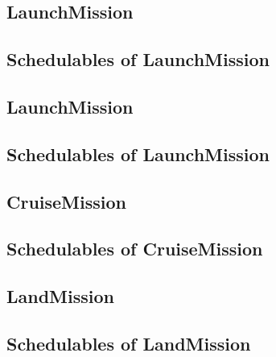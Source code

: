 \documentclass[10pt,a4paper]{article}
\begin{document}
\subsection{LaunchMission}

\newpage

\subsection{Schedulables of LaunchMission}


\newpage


\subsection{LaunchMission}

\newpage

\subsection{Schedulables of LaunchMission}


\newpage


\subsection{CruiseMission}

\newpage

\subsection{Schedulables of CruiseMission}


\newpage


\newpage


\newpage


\subsection{LandMission}

\newpage

\subsection{Schedulables of LandMission}


\newpage
\end{document}
